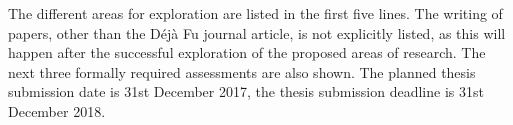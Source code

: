 \documentclass{article}
\begin{document}
The different areas for exploration are listed in the first five
lines. The writing of papers, other than the D\'{e}j\`{a} Fu journal
article, is not explicitly listed, as this will happen after the
successful exploration of the proposed areas of research. The next
three formally required assessments are also shown.  The planned
thesis submission date is 31st December 2017, the thesis submission
deadline is 31st December 2018.



\end{document}
